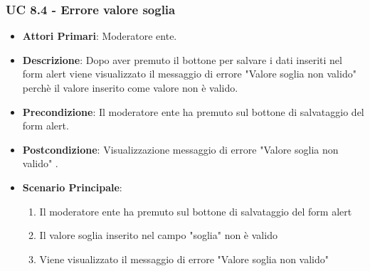 			\subsubsection{UC 8.4 - Errore valore soglia}
			\begin{itemize}
				\item \textbf{Attori Primari}: Moderatore ente.
				\item \textbf{Descrizione}: Dopo aver premuto il bottone per salvare i dati inseriti nel form alert viene visualizzato il messaggio di errore "Valore soglia non valido" perchè il valore inserito come valore non è valido.
				\item \textbf{Precondizione}: Il moderatore ente ha premuto sul bottone di salvataggio del form alert.
				\item \textbf{Postcondizione}: Visualizzazione messaggio di errore "Valore soglia non valido" .
				\item \textbf{Scenario Principale}:
				\begin{enumerate}
					\item{Il moderatore ente ha premuto sul bottone di salvataggio del form alert}
					\item{Il valore soglia inserito nel campo "soglia" non è valido}
					\item{Viene visualizzato il messaggio di errore "Valore soglia non valido" }
				\end{enumerate}
			\end{itemize}
			
